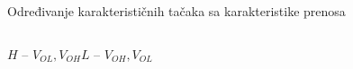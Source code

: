 \begin{frame}[label=08-s019]{Određivanje karakterističnih tačaka sa karakteristike prenosa}
\centering\par\smallskip
\begin{columns}[c,onlytextwidth]\centering
{}\centering\end{columns}\smallskip\par
\centering $H$ – $V_{OL},V_{OH}$\qquad $L$ – $V_{OH},V_{OL}$
\end{frame}
